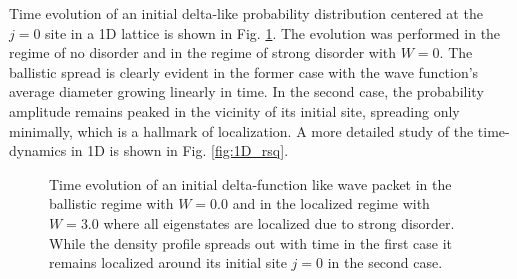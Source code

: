 \documentclass[10pt,a4paper]{article}
\begin{document}
\begin{minipage}[t]{0.27\textwidth}
Time evolution of an initial delta-like probability distribution centered at the $j=0$ site in a 1D lattice is shown in Fig. \ref{fig:light_cone}. The evolution was performed in the regime of no disorder and in the regime of strong disorder with $W=0.$ The ballistic spread is clearly evident in the former case with the wave function's average diameter growing linearly in time. In the second case, the probability amplitude remains peaked in the vicinity of its initial site, spreading only minimally, which is a hallmark of localization. A more detailed study of the time-dynamics in 1D is shown in Fig. \ref{fig:1D_rsq}.
\end{minipage}\hfill
\begin{minipage}[t]{0.72\textwidth}
\begin{figure}[H]
\caption{Time evolution of an initial delta-function like wave packet in the ballistic regime with $W=0.0$ and in the localized regime with $W=3.0$ where all eigenstates are localized due to strong disorder. While the density profile spreads out with time in the first case it remains localized around its initial site $j=0$ in the second case. }
\label{fig:light_cone} 
\end{figure}
\end{minipage}\\\\
\end{document}
